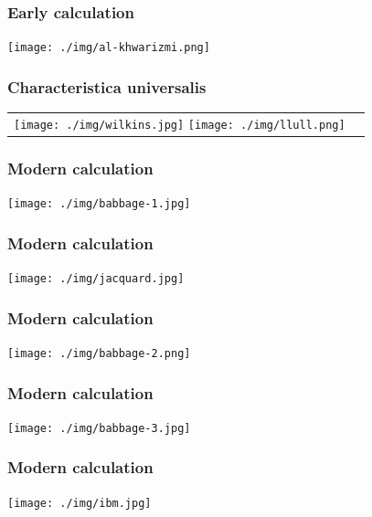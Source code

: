 \documentclass[11pt]{beamer}
\begin{document}
\begin{frame}[fragile]
  \frametitle{Early calculation}

  \texttt{[image: ./img/al-khwarizmi.png]}
\end{frame}

\begin{frame}[fragile]
  \frametitle{Characteristica universalis}

  \begin{tabular}{cc}
  \texttt{[image: ./img/wilkins.jpg]}
  \texttt{[image: ./img/llull.png]}
  \end{tabular}
\end{frame}

\begin{frame}[fragile]
  \frametitle{Modern calculation}

  \texttt{[image: ./img/babbage-1.jpg]}
\end{frame}

\begin{frame}[fragile]
  \frametitle{Modern calculation}

  \texttt{[image: ./img/jacquard.jpg]}
\end{frame}

\begin{frame}[fragile]
  \frametitle{Modern calculation}

  \texttt{[image: ./img/babbage-2.png]}
\end{frame}

\begin{frame}[fragile]
  \frametitle{Modern calculation}

  \texttt{[image: ./img/babbage-3.jpg]}
\end{frame}

\begin{frame}[fragile]
  \frametitle{Modern calculation}

  \texttt{[image: ./img/ibm.jpg]}


\end{frame}
\end{document}
